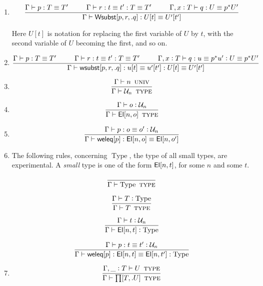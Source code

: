\documentclass[11pt]{article}
\newcommand{\eqd}{\equiv}
\newcommand{\Eu}{{\cal U}}
\newcommand\spc{{\hskip 26pt}}
\newcommand{\ccolon}{\vcentcolon}
\newcommand{\ccheck}{\vcentcolon}            %
\newcommand{\csynth}{\vcentcolon\vcentcolon} %
\renewcommand{\csynth}{\ccheck}              %
\newcommand{\Univ}{\mathop{\text{ \sc univ}}}
\newcommand{\TYPE}{\mathop{\text{ \sc type}}}
\newcommand{\Type}{\mathop{\text{Type}}}
\newcommand{\ha}[2]{#1[#2]}
\newcommand{\El}{{\sf El}}
\newcommand{\annot}{{\sf annot}}
\newcommand{\haa}[2]{\ha\annot{#1,#2}}
\renewcommand{\haa}[2]{#1}
\newcommand{\weleq}{{\sf weleq}}
\newcommand{\Wsubst}{{\sf Wsubst}}
\newcommand{\wsubst}{{\sf wsubst}}
\newcommand{\var}{\char`_}
\begin{document}
\begin{enumerate}


\item 
\[ \frac{ 
  \Gamma \vdash p:T \eqd T'  
  \spc
  \Gamma \vdash r:t \eqd t' : T \eqd T'  
  \spc
  \Gamma,  x \ccolon T \vdash q: U \eqd p^*U'
  } {
  \Gamma \vdash \ha\Wsubst{p,r,.q} : U[t] \eqd U'[t']
}\]

Here $U[t]$ is notation for replacing the first variable of $U$ by $t$, with
the second variable of $U$ becoming the first, and so on.  

\item 
\[ \frac{ 
  \Gamma \vdash p:T \eqd T'  
  \spc
  \Gamma \vdash r:t \eqd t' : T \eqd T'  
  \spc
  \Gamma,  x \ccolon T \vdash q:u \eqd p^* u' \ccolon U \eqd p^*U'
  } {
  \Gamma \vdash \ha\wsubst{p,r,.q} : u[t] \eqd u'[t'] : U[t] \eqd U'[t']
}\]

\item

\[\frac{\Gamma \vdash n \Univ  }
       {\Gamma \vdash \Eu_n \TYPE  }\]

\item

\[\frac{
  \Gamma \vdash o \csynth{\Eu_n}}{
  \Gamma \vdash \ha\El{n,o}\TYPE }\]

\item 

\[\frac{\Gamma \vdash p : o \eqd o' \ccheck \Eu_n}
       {\Gamma \vdash \ha\weleq{p} : \ha\El{n,o} \eqd \ha\El{n,o'}}\]

\item
The following rules, concerning $\Type$, the type of all small types, are
experimental.  A {\em small} type is one of the form $\ha\El{n,t}$, for some
$n$ and some $t$.

\[\frac{}
       {\Gamma \vdash \Type \TYPE }\]

\[\frac{\Gamma \vdash T \ccolon \Type}
       {\Gamma \vdash T \TYPE}\]

\[\frac{\Gamma \vdash t \ccolon \Eu_n}
       {\Gamma \vdash \ha\El{n,t} \ccheck \Type}\]

\[\frac{\Gamma \vdash p : t \eqd t' \ccheck \Eu_n}
       {\Gamma \vdash \ha\weleq{p} : \ha\El{n,t} \eqd \ha\El{n,t'} : \Type }\]

\item 
\[\frac{ \Gamma, \var \ccolon T \vdash U\TYPE  }{\Gamma \vdash \ha\prod{T,.U}\TYPE}\]


\end{enumerate}
\end{document}
